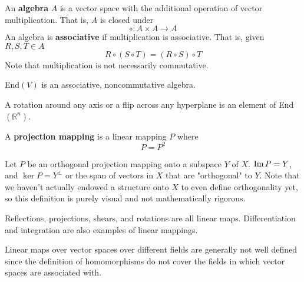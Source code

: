   \begin{definition}[Algebra]
    An \textbf{algebra} $A$ is a vector space with the additional operation of vector multiplication. That is, $A$ is closed under 
    \begin{equation}
      \circ: A \times A \longrightarrow A
    \end{equation}
    An algebra is \textbf{associative} if multiplication is associative. That is, given $R, S, T \in A$
    \begin{equation}
      R \circ (S \circ T) = (R \circ S) \circ T
    \end{equation}
    Note that multiplication is not necessarily commutative. 
  \end{definition}

  \begin{proposition}
    End$(V)$ is an associative, noncommutative algebra. 
  \end{proposition}

  \begin{example}
    A rotation around any axis or a flip across any hyperplane is an element of End$(\mathbb{R}^n)$. 
  \end{example}

  \begin{definition}[Projection]
    A \textbf{projection mapping} is a linear mapping $P$ where 
    \begin{equation}
      P = P^2
    \end{equation}
  \end{definition}

  \begin{example}
    Let $P$ be an orthogonal projection mapping onto a subspace $Y$ of $X$. $\im P = Y$, and $\ker P = Y^\perp$ or the span of vectors in $X$ that are "orthogonal" to $Y$. Note that we haven't actually endowed a structure onto $X$ to even define orthogonality yet, so this definition is purely visual and not mathematically rigorous. 
  \end{example}

  \begin{example}
    Reflections, projections, shears, and rotations are all linear maps. Differentiation and integration are also examples of linear mappings. 
  \end{example}

  Linear maps over vector spaces over different fields are generally not well defined since the definition of homomorphisms do not cover the fields in which vector spaces are associated with. 

